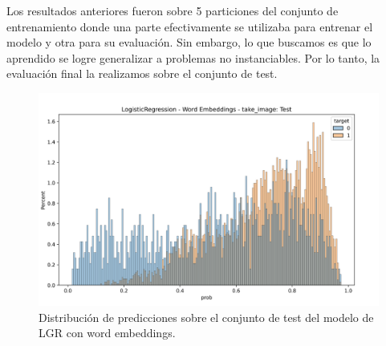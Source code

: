 Los resultados anteriores fueron sobre 5 particiones del conjunto de
entrenamiento donde una parte efectivamente se utilizaba para entrenar el modelo
y otra para su evaluación. Sin embargo, lo que buscamos es que lo aprendido se
logre generalizar a problemas no instanciables. Por lo tanto, la evaluación
final la realizamos sobre el conjunto de test.

\begin{figure}[t!]
    \centering
    \includegraphics[width=0.7\linewidth]{figures/results/word_embeddings/lgr/take_image/lgr_wb_take_image_test.png}
    \caption{Distribución de predicciones sobre el conjunto de test del modelo de LGR con word embeddings.}
    \label{fig:takeimage-bestmodel-distplot-test}
\end{figure}

